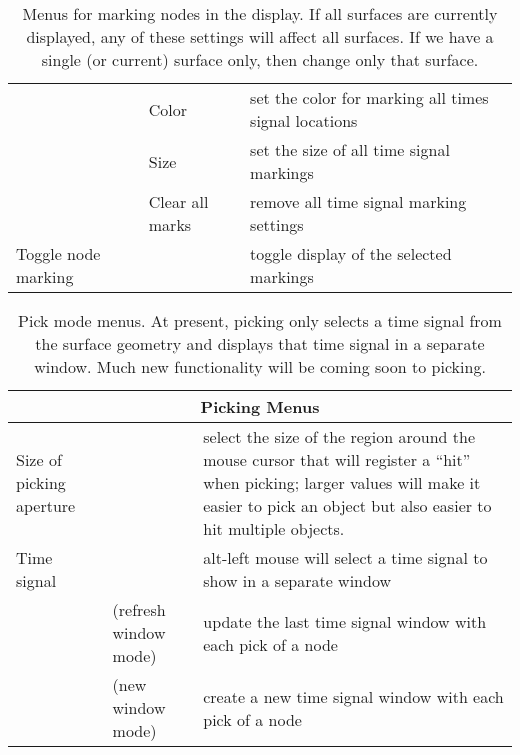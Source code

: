 \begin{table}[ht]
\begin{center}
\begin{tabular}{|l|l|p{3 in}|}
    &  Color & set the color for marking all times signal locations \\
    &  Size & set the size of all time signal markings \\
   &  Clear all marks & remove all time signal marking settings \\ 
    \hline
    Toggle node marking & & toggle display of the selected markings \\ 
    \hline
    \end{tabular}
  \end{center}
\caption{Menus for marking nodes in the display.  If all surfaces are
currently displayed, any of these settings will affect all surfaces.  If we
have a single (or current) surface only, then change only that surface.}
\label{table:nodemarking}
\end{table}


\begin{table}[ht]
  \begin{center}
    \begin{tabular}{|l|l|p{3 in}|} \hline
      \multicolumn{3}{|c|}{Picking Menus} \\ \hline
    Size of picking aperture & & select the size of the region around the
    mouse 
    cursor that will register a ``hit'' when picking; larger values will
    make it easier to pick an object but also easier to hit multiple
    objects. \\
    Time signal & & alt-left mouse will select a time signal to show in a
    separate window\\
    & (refresh window mode) & update the last time signal window with each
    pick of a node \\
    & (new window mode) & create a new time signal window with each pick of a
    node \\ \hline
    \end{tabular}
  \end{center}
\caption{Pick mode menus.  At present, picking only selects a time signal
from the surface geometry and displays that time signal in a separate
window.  Much new functionality will be coming soon to picking.}
\label{table:picking} 
\end{table}


